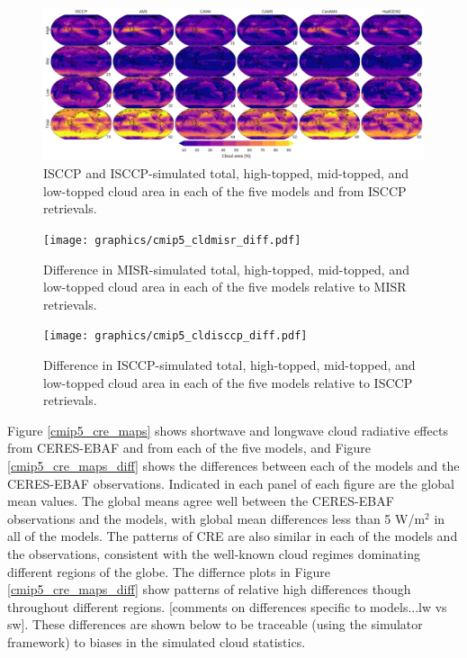\begin{figure}
\centering
\includegraphics[width=\columnwidth]{graphics/cmip5_cldisccp.pdf}
\caption{ISCCP and ISCCP-simulated total, high-topped, mid-topped, and low-topped cloud area in each of the five models and from ISCCP retrievals.}
\label{cmip5_cldisccp_maps}
\end{figure}

\begin{figure}
\centering
\texttt{[image: graphics/cmip5\_cldmisr\_diff.pdf]}
\caption{Difference in MISR-simulated total, high-topped, mid-topped, and low-topped cloud area in each of the five models relative to MISR retrievals.}
\label{cmip5_cldmisr_maps_diff}
\end{figure}

\begin{figure}
\centering
\texttt{[image: graphics/cmip5\_cldisccp\_diff.pdf]}
\caption{Difference in ISCCP-simulated total, high-topped, mid-topped, and low-topped cloud area in each of the five models relative to ISCCP retrievals.}
\label{cmip5_cldisccp_maps_diff}
\end{figure}


Figure \ref{cmip5_cre_maps} shows shortwave and longwave cloud radiative effects from CERES-EBAF and from each of the five models, and Figure \ref{cmip5_cre_maps_diff} shows the differences between each of the models and the CERES-EBAF observations. Indicated in each panel of each figure are the global mean values. The global means agree well between the CERES-EBAF observations and the models, with global mean differences less than 5 W/m$^2$ in all of the models. The patterns of CRE are also similar in each of the models and the observations, consistent with the well-known cloud regimes dominating different regions of the globe. The differnce plots in Figure \ref{cmip5_cre_maps_diff} show patterns of relative high differences though throughout different regions. [comments on differences specific to models...lw vs sw]. These differences are shown below to be traceable (using the simulator framework) to biases in the simulated cloud statistics.


